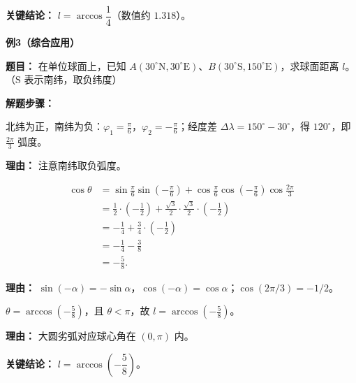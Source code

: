 \begin{examplebox}
	\medskip
	\textbf{\textcolor{CExample}{关键结论：}}
	$\boxed{l = \arccos\dfrac14}$（数值约 $1.318$）。

	\medskip
	\textbf{\textcolor{CExample}{例3（综合应用）}}

	\medskip
	\textbf{\textcolor{CExample}{题目：}}
	在单位球面上，已知 $A(30^\circ\mathrm{N},30^\circ\mathrm{E})$、$B(30^\circ\mathrm{S},150^\circ\mathrm{E})$，求球面距离 $l$。（$\mathrm{S}$ 表示南纬，取负纬度）

	\medskip
	\textbf{\textcolor{CExample}{解题步骤：}}
	\begin{description}[style=nextline, leftmargin=2.8em, labelsep=0.5em, itemsep=0.45em]
		\item[\textbf{第一步（处理符号与弧度）：}]
			北纬为正，南纬为负：$\varphi_1 = \frac{\pi}{6}$，$\varphi_2 = -\frac{\pi}{6}$；经度差 $\Delta\lambda = 150^\circ-30^\circ$，得 $120^\circ$，即 $\frac{2\pi}{3}$ 弧度。
			\par\textbf{理由：} 注意南纬取负弧度。
		\item[\textbf{第二步（代入公式）：}]
			\[
				\begin{aligned}
					\cos\theta
					&= \sin\frac{\pi}{6}\sin\left(-\frac{\pi}{6}\right) + \cos\frac{\pi}{6}\cos\left(-\frac{\pi}{6}\right)\cos\frac{2\pi}{3}\\
					&= \frac12\cdot\left(-\frac12\right) + \frac{\sqrt3}{2}\cdot\frac{\sqrt3}{2}\cdot\left(-\frac12\right)\\
					&= -\frac14 + \frac34\cdot\left(-\frac12\right)\\
					&= -\frac14 - \frac38\\
					&= -\frac58.
			\end{aligned}
			\]
			\par\textbf{理由：} $\sin(-\alpha)=-\sin\alpha$，$\cos(-\alpha)=\cos\alpha$；$\cos(2\pi/3)=-1/2$。
		\item[\textbf{第三步（求弧长）：}]
			$\theta = \arccos\left(-\frac58\right)$，且 $\theta<\pi$，故 $l = \arccos\left(-\frac58\right)$。
			\par\textbf{理由：} 大圆劣弧对应球心角在 $(0,\pi)$ 内。
	\end{description}

	\medskip
	\textbf{\textcolor{CExample}{关键结论：}}
	$\boxed{l = \arccos\left(-\dfrac58\right)}$。
\end{examplebox}
